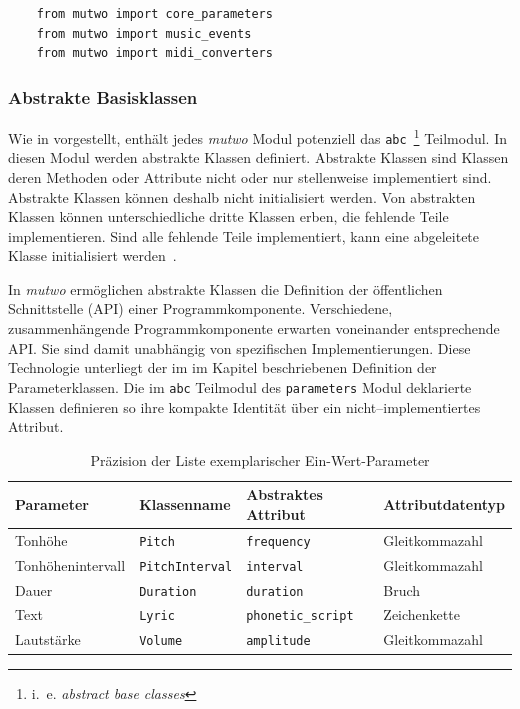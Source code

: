 \documentclass[12pt,a4paper,ngerman]{article}
\begin{document}
\begin{lstlisting}
    from mutwo import core_parameters
    from mutwo import music_events
    from mutwo import midi_converters
\end{lstlisting}

\subsubsection{Abstrakte Basisklassen}
\label{abstractBaseClasses}

Wie in \emph{} vorgestellt, enthält jedes \emph{mutwo} Modul potenziell das \texttt{abc}~\footnote{%
    i.\ e. \emph{abstract base classes}%
} Teilmodul.
In diesen Modul werden abstrakte Klassen definiert.
Abstrakte Klassen sind Klassen deren Methoden oder Attribute nicht oder nur stellenweise implementiert sind.
Abstrakte Klassen können deshalb nicht initialisiert werden.
Von abstrakten Klassen können unterschiedliche dritte Klassen erben, die fehlende Teile implementieren.
Sind alle fehlende Teile implementiert, kann eine abgeleitete Klasse initialisiert werden~\parencite{abstractTypeWiki}.

\bigskip

In \emph{mutwo} ermöglichen abstrakte Klassen die Definition der öffentlichen Schnittstelle (API) einer Programmkomponente.
Verschiedene, zusammenhängende Programmkomponente erwarten voneinander entsprechende API.
Sie sind damit unabhängig von spezifischen Implementierungen.
Diese Technologie unterliegt der im im Kapitel \emph{} beschriebenen Definition der Parameterklassen.
Die im \texttt{abc} Teilmodul des \texttt{parameters} Modul deklarierte Klassen definieren so ihre kompakte Identität über ein nicht--implementiertes Attribut.

\begin{table}[h!]
    \begin{center}
        \begin{tabular}{l l l l} 
            \hline
            Parameter & Klassenname & Abstraktes Attribut & Attributdatentyp \\ [0.5ex] 
            \hline\hline
            Tonhöhe & \texttt{Pitch} & \texttt{frequency} & Gleitkommazahl \\ 
            Tonhöhenintervall & \texttt{PitchInterval} & \texttt{interval} & Gleitkommazahl \\ 
            Dauer & \texttt{Duration} & \texttt{duration} & Bruch \\ 
            Text & \texttt{Lyric} & \texttt{phonetic\_script} & Zeichenkette \\ 
            Lautstärke & \texttt{Volume} & \texttt{amplitude} & Gleitkommazahl \\ [1ex] 
            \hline
        \end{tabular}
    \end{center}

    \caption{Präzision der Liste exemplarischer Ein-Wert-Parameter}
\end{table}
\end{document}
